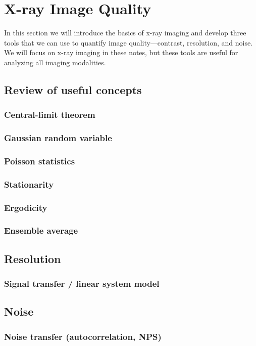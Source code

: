 \documentclass[mphy386-notes.tex]{subfiles}
\begin{document}
\section{X-ray Image Quality}
In this section we will introduce the basics of x-ray imaging and develop three
tools that we can use to quantify image quality---contrast, resolution, and
noise. We will focus on x-ray imaging in these notes, but these tools are
useful for analyzing all imaging modalities.

\subsection{Review of useful concepts}
\subsubsection{Central-limit theorem}
\subsubsection{Gaussian random variable}
\subsubsection{Poisson statistics}
\subsubsection{Stationarity}
\subsubsection{Ergodicity}
\subsubsection{Ensemble average}
\subsection{Resolution}
\subsubsection{Signal transfer / linear system model}
\subsection{Noise}
\subsubsection{Noise transfer (autocorrelation, NPS)}
\end{document}
